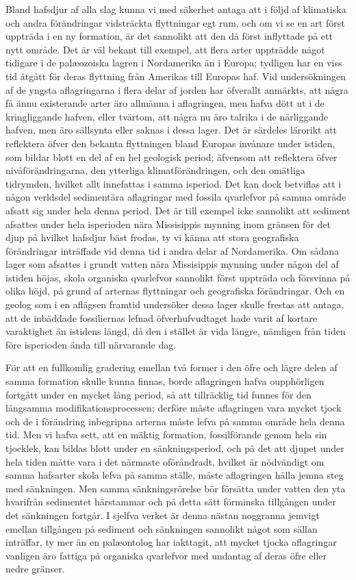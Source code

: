 Bland hafsdjur af alla slag kunna vi med säkerhet antaga att i följd af klimatiska och andra förändringar vidsträckta flyttningar egt rum, och om vi se en art först uppträda i en ny formation, är det sannolikt att den då först inflyttade på ett nytt område. Det är väl bekant till exempel, att flera arter uppträdde något tidigare i de palæozoiska lagren i Nordamerika än i Europa; tydligen har en viss tid åtgått för deras flyttning från Amerikas till Europas haf. Vid undersökningen af de yngsta aflagringarna i flera delar af jorden har öfverallt anmärkts, att några få ännu existerande arter äro allmänna i aflagringen, men hafva dött ut i de kringliggande hafven, eller tvärtom, att några nu äro talrika i de närliggande hafven, men äro sällsynta eller saknas i dessa lager. Det är särdeles lärorikt att reflektera öfver den bekanta flyttningen bland Europas invånare under istiden, som bildar blott en del af en hel geologisk period; äfvensom att reflektera öfver nivåförändringarna, den ytterliga klimatförändringen, och den omätliga tidrymden, hvilket allt innefattas i samma isperiod. Det kan dock betviflas att i någon verldsdel sedimentära aflagringar med fossila qvarlefvor på samma område afsatt sig under hela denna period. Det är till exempel icke sannolikt att sediment afsattes under hela isperioden nära Missisippis mynning inom gränsen för det djup på hvilket hafsdjur bäst frodas, ty vi känna att stora geografiska förändringar inträffade vid denna tid i andra delar af Nordamerika. Om sådana lager som afsattes i grundt vatten nära Missisippis mynning under någon del af istiden höjas, skola organiska qvarlefvor sannolikt först uppträda och försvinna på olika höjd, på grund af arternas flyttningar och geografiska förändringar. Och en geolog som i en aflägsen framtid undersöker dessa lager skulle frestas att antaga, att de inbäddade fossiliernas lefnad öfverhufvudtaget hade varit af kortare varaktighet än istidens längd, då den i stället är vida längre, nämligen från tiden före isperioden ända till närvarande dag.

För att en fullkomlig gradering emellan två former i den öfre och lägre delen af samma formation skulle kunna finnas, borde aflagringen hafva oupphörligen fortgått under en mycket lång period, så att tillräcklig tid funnes för den långsamma modifikationsprocessen; derföre måste aflagringen vara mycket tjock och de i förändring inbegripna arterna måste lefva på samma område hela denna tid. Men vi hafva sett, att en mäktig formation, fossilförande genom hela sin tjocklek, kan bildas blott under en sänkningsperiod, och på det att djupet under hela tiden måtte vara i det närmaste oförändradt, hvilket är nödvändigt om samma hafsarter skola lefva på samma ställe, måste aflagringen hålla jemna steg med sänkningen. Men samma sänkningsrörelse bör försätta under vatten den yta hvarifrån sedimentet härstammar och på detta sätt förminska tillgången under det sänkningen fortgår. I sjelfva verket är denna nästan noggranna jemvigt emellan tillgången på sediment och sänkningen sannolikt något som sällan inträffar, ty mer än en palæontolog har iakttagit, att mycket tjocka aflagringar vanligen äro fattiga på organiska qvarlefvor med undantag af deras öfre eller nedre gränser.

